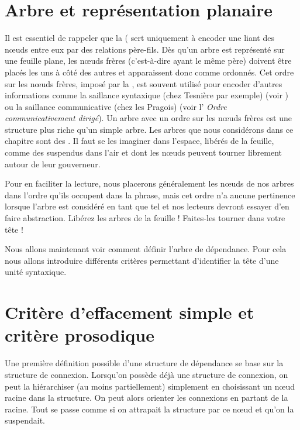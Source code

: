 \section{Arbre et représentation planaire}\label{sec:3.3.6}

Il est essentiel de rappeler que la  ( sert uniquement à encoder une  liant des nœuds entre eux par des relations père-fils. Dès qu’un arbre est représenté sur une feuille plane, les nœuds frères (c’est-à-dire ayant le même père) doivent être placés les uns à côté des autres et apparaissent donc comme ordonnés. Cet ordre sur les nœuds frères, imposé par la , est souvent utilisé pour encoder d'autres informations comme la saillance syntaxique (chez Tesnière par exemple) (voir ) ou la saillance communicative (chez les Pragois) (voir l' \textit{Ordre communicativement dirigé}). Un arbre avec un ordre sur les nœuds frères est une structure plus riche qu’un simple arbre. Les arbres que nous considérons dans ce chapitre sont des . Il faut se les imaginer dans l’espace, libérés de la feuille, comme des  suspendus dans l’air et dont les nœuds peuvent tourner librement autour de leur gouverneur.

Pour en faciliter la lecture, nous placerons généralement les nœuds de nos arbres dans l’ordre qu’ils occupent dans la phrase, mais cet ordre n’a aucune pertinence lorsque l’arbre est considéré en tant que tel et nos lecteurs devront essayer d’en faire abstraction. Libérez les arbres de la feuille ! Faites-les tourner dans votre tête !

Nous allons maintenant voir comment définir l’arbre de dépendance. Pour cela nous allons introduire différents critères permettant d’identifier la tête d’une unité syntaxique.

\section{Critère d’effacement simple et critère prosodique}\label{sec:3.3.7}

Une première définition possible d’une structure de dépendance se base sur la structure de connexion. Lorsqu’on possède déjà une structure de connexion, on peut la hiérarchiser (au moins partiellement) simplement en choisissant un nœud racine dans la structure. On peut alors orienter les connexions en partant de la racine. Tout se passe comme si on attrapait la structure par ce nœud et qu’on la suspendait.

